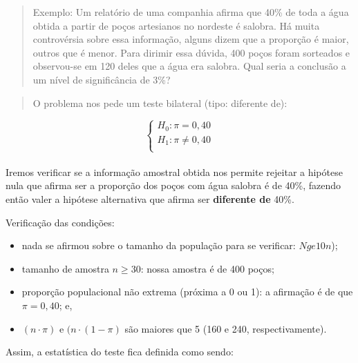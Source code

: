 \documentclass[
]{book}
\providecommand{\tightlist}{%
  \setlength{\itemsep}{0pt}\setlength{\parskip}{0pt}}
\begin{document}
\hfill\break

\begin{quote}
Exemplo: Um relatório de uma companhia afirma que 40\% de toda a água obtida a partir de poços artesianos no nordeste é salobra. Há muita controvérsia sobre essa informação, alguns dizem que a proporção é maior, outros que é menor. Para dirimir essa dúvida, 400 poços foram sorteados e observou-se em 120 deles que a água era salobra. Qual seria a conclusão a um nível de significância de 3\%?
\end{quote}

\hfill\break

\begin{quote}
O problema nos pede um teste bilateral (tipo: diferente de):
\end{quote}

\hfill\break

\[
\begin{cases}
    H_{0}: \pi = 0,40\\
    H_{1}: \pi \ne 0,40\\
\end{cases}
\]\\

Iremos verificar se a informação amostral obtida nos permite rejeitar a hipótese nula que afirma ser a proporção dos poços com água salobra é de 40\%, fazendo então valer a hipótese alternativa que afirma ser \textbf{diferente de} 40\%.

\hfill\break

Verificação das condições:

\hfill\break

\begin{itemize}
\tightlist
\item
  nada se afirmou sobre o tamanho da população para se verificar: \(N ge 10n\));
\item
  tamanho de amostra \(n \ge 30\): nossa amostra é de 400 poços;\\
\item
  proporção populacional não extrema (próxima a 0 ou 1): a afirmação é de que \(\pi=0,40\); e,\\
\item
  \((n \cdot \pi)\) e \((n \cdot (1-\pi)\) são maiores que 5 (160 e 240, respectivamente).
\end{itemize}

\hfill\break

Assim, a estatística do teste fica definida como sendo:
\end{document}
